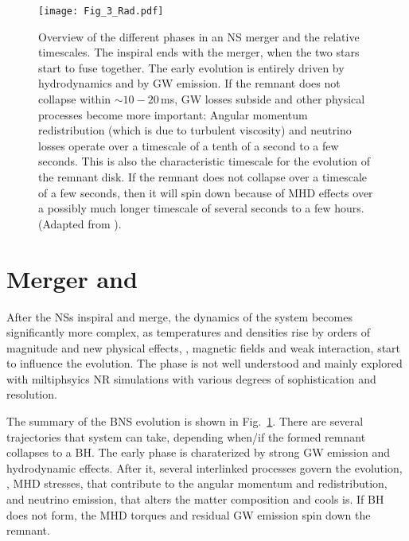 \begin{figure}[t]
    \centering
    \texttt{[image: Fig\_3\_Rad.pdf]}
    \caption{
        Overview of the different phases in an \ac{NS} merger and the relative timescales. 
        The inspiral ends with the merger, when the two stars start to fuse together. 
        The early \pmerg{} evolution is entirely driven by hydrodynamics and by \ac{GW} emission. 
        If the remnant does not collapse within ${\sim}10-20\,$ms, \ac{GW} losses
        subside and other physical processes become more important: 
        Angular momentum redistribution (which is due to turbulent viscosity) 
        and neutrino losses operate over a timescale of a tenth of a second to a few
        seconds. This is also the characteristic timescale for the evolution of the remnant disk. 
        If the remnant does not collapse over a timescale of a few seconds, then it will 
        spin down because of \ac{MHD} effects over a possibly much longer timescale 
        of several seconds to a few hours. 
        (Adapted from \citet{Radice:2020ddv}).
    }
    \label{fig:intro:RadFig1}
\end{figure}


\section{Merger and \pmerg{}}

After the \acp{NS} inspiral and merge, the dynamics of the system becomes significantly 
more complex, as temperatures and densities rise by orders of magnitude and new 
physical effects, \eg, magnetic fields and weak interaction, start to influence the evolution. 
The \pmerg{} phase is not well understood and mainly explored with miltiphsyics \ac{NR} 
simulations with various degrees of sophistication and resolution. 

The summary of the \ac{BNS} \pmerg{} evolution is shown in Fig.~\ref{fig:intro:RadFig1}. 
There are several trajectories that system can take, depending when/if the formed remnant 
collapses to a \ac{BH}. The early \pmerg{} phase is charaterized by strong \ac{GW} 
emission and hydrodynamic effects. After it, several interlinked processes govern the 
evolution, \eg, \ac{MHD} stresses, that contribute to the angular momentum and redistribution, 
and neutrino emission, that alters the matter composition and cools is.
If \ac{BH} does not form, the \ac{MHD} torques and residual \ac{GW} emission spin down 
the remnant.

